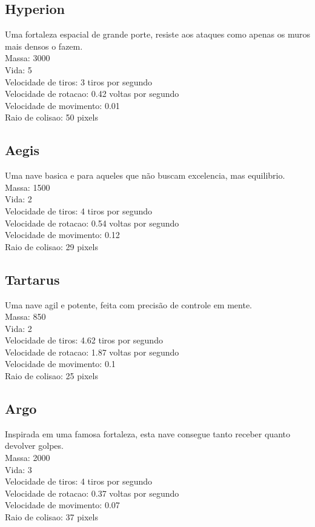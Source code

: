 \documentclass[a4paper]{book}
\begin{document}
\subsection {Hyperion}
Uma fortaleza espacial de grande porte, resiste aos ataques como apenas os muros mais densos o fazem.
\\Massa: 3000
\\Vida: 5
\\Velocidade de tiros: 3 tiros por segundo
\\Velocidade de rotacao: 0.42 voltas por segundo
\\Velocidade de movimento: 0.01
\\Raio de colisao: 50 pixels

\subsection {Aegis}
Uma nave basica e para aqueles que não buscam excelencia, mas equilibrio.
\\Massa: 1500
\\Vida: 2
\\Velocidade de tiros: 4 tiros por segundo
\\Velocidade de rotacao: 0.54 voltas por segundo
\\Velocidade de movimento: 0.12
\\Raio de colisao: 29 pixels

\subsection {Tartarus}
Uma nave agil e potente, feita com precisão de controle em mente.
\\Massa: 850
\\Vida: 2
\\Velocidade de tiros: 4.62 tiros por segundo
\\Velocidade de rotacao: 1.87 voltas por segundo
\\Velocidade de movimento: 0.1
\\Raio de colisao: 25 pixels

\subsection {Argo}
Inspirada em uma famosa fortaleza, esta nave consegue tanto receber quanto devolver golpes.
\\Massa: 2000
\\Vida: 3
\\Velocidade de tiros: 4 tiros por segundo
\\Velocidade de rotacao: 0.37 voltas por segundo
\\Velocidade de movimento: 0.07
\\Raio de colisao: 37 pixels
\end{document}
